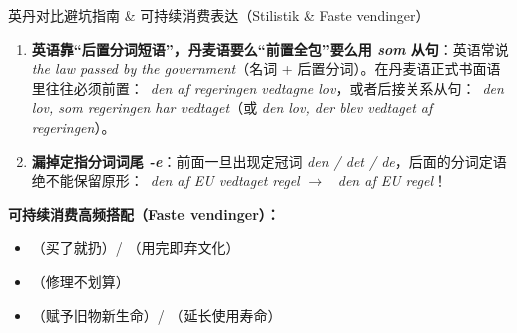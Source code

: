 \begin{grammatikbox}{英丹对比避坑指南 \& 可持续消费表达（Stilistik \& Faste vendinger）}
\begin{enumerate}
  \item \textbf{英语靠“后置分词短语”，丹麦语要么“前置全包”要么用 \textit{som} 从句}：英语常说 \textit{the law passed by the government}（名词 + 后置分词）。在丹麦语正式书面语里往往必须前置：\ \textit{den af regeringen vedtagne lov}，或者后接关系从句：\ \textit{den lov, som regeringen har vedtaget}（或 \textit{den lov, der blev vedtaget af regeringen}）。
  \item \textbf{漏掉定指分词词尾 \textit{-e}}：前面一旦出现定冠词 \textit{den / det / de}，后面的分词定语绝不能保留原形：\ \textit{den af EU vedtaget regel} $\rightarrow$ \ \textit{den af EU  regel}！
\end{enumerate}

\textbf{可持续消费高频搭配（Faste vendinger）：}
\begin{itemize}
  \item {}（买了就扔）/ （用完即弃文化）
  \item {}（修理不划算）
  \item {}（赋予旧物新生命）/ （延长使用寿命）
\end{itemize}
\end{grammatikbox}


